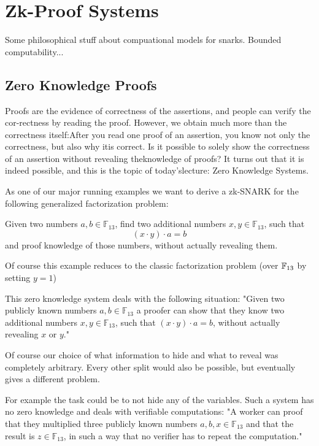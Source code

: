 \chapter{Zk-Proof Systems}

Some philosophical stuff about compuational models for snarks. Bounded computability...


\section{Zero Knowledge Proofs}
Proofs are the evidence of correctness of the assertions, and people can verify the cor-rectness by reading the proof. However, we obtain much more than the correctness itself:After you read one proof of an assertion, you know not only the correctness, but also why itis correct. Is it possible to solely show the correctness of an assertion without revealing theknowledge of proofs? It turns out that it is indeed possible, and this is the topic of today’slecture: Zero Knowledge Systems.

\begin{example}
\label{main_example_2_1}
As one of our major running examples we want to derive a zk-SNARK for the following generalized factorization problem: 

Given two numbers $a,b\in \mathbb{F}_{13}$, find two additional numbers $x,y\in \mathbb{F}_{13}$, such that
$$
(x\cdot y) \cdot a = b 
$$
and proof knowledge of those numbers, without actually revealing them.

Of course this example reduces to the classic factorization problem (over $\mathbb{F}_{13}$ by setting $y=1$)

This zero knowledge system deals with the following situation: "Given two publicly known numbers $a,b \in \mathbb{F}_{13}$ a proofer can show that they know two additional numbers $x,y\in \mathbb{F}_{13}$, such that $(x\cdot y) \cdot a = b$, without actually revealing $x$ or $y$." 

Of course our choice of what information to hide and what to reveal was completely arbitrary. Every other split would also be possible, but eventually gives a different problem. 

For example the task could be to not hide any of the variables.  Such 
a system has no zero knowledge and deals with verifiable computations: "A worker can proof that they multiplied three publicly known numbers $a,b,x \in \mathbb{F}_{13}$ and that the result is $z \in \mathbb{F}_{13}$, in such a way that no verifier has to repeat the computation."
\end{example}

